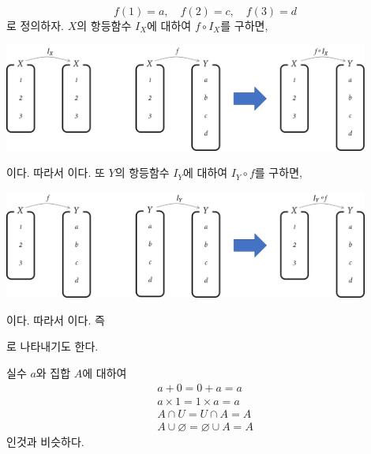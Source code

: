 \documentclass{oblivoir}
\begin{document}
\newpage
%
\label{composition6}
\[f(1)=a,\quad f(2)=c,\quad f(3)=d\]
로 정의하자.
\(X\)의 항등함수 \(I_X\)에 대하여 \(f\circ I_X\)를 구하면,
\begin{center}
\includegraphics[width=0.9\textwidth]{composition_6-1}
\end{center}
이다.
따라서 이다.
또 \(Y\)의 항등함수 \(I_Y\)에 대하여 \(I_Y\circ f\)를 구하면,
\begin{center}
\includegraphics[width=0.9\textwidth]{composition_6-2}
\end{center}
이다.
따라서 이다.
즉
\begin{center}
\end{center}
로 나타내기도 한다.

\bigskip
실수 \(a\)와 집합 \(A\)에 대하여
\begin{gather*}
a+0=0+a=a\\
a\times1=1\times a=a\\
A\cap U=U\cap A=A\\
A\cup\varnothing=\varnothing\cup A=A
\end{gather*}
인것과 비슷하다.
\end{document}
